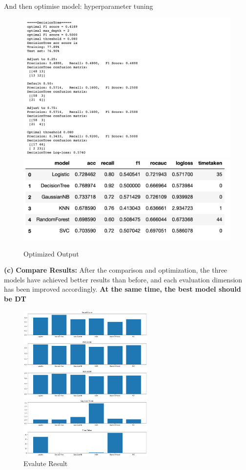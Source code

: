 \documentclass[11pt]{article}
\renewcommand\part[1]{\vspace{.10in}\textbf{(#1)}}
\newcommand\runtime{\vspace{.10in}\textbf{Compare Results: }}
\begin{document}
And then optimise model: hyperparameter tuning
\begin{figure}[H]
    \centering
    \includegraphics[width=1\textwidth]{Fig11}
    \includegraphics[width=1\textwidth]{Fig10}
    \caption{Optimized Output}
\end{figure}

\part{c} \runtime
After the comparison and optimization, the three models have achieved better results than before, and each evaluation dimension has been improved accordingly.
\textbf{At the same time, the best model should be DT}

\begin{figure}[H]
    \centering
    \includegraphics[width=0.6\textwidth]{Fig6}
    \caption{Evalute Result}
    \label{}
\end{figure}
\end{document}

